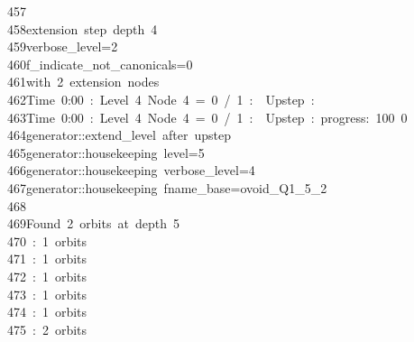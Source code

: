 \begin{tabbing}
457\>\\[0pt]
458\>extension\ step\ depth\ 4\\[0pt]
459\>verbose\_level=2\\[0pt]
460\>f\_indicate\_not\_canonicals=0\\[0pt]
461\>with\ 2\ extension\ nodes\\[0pt]
462\>Time\ 0:00\ :\ Level\ 4\ Node\ 4\ =\ 0\ /\ 1\ :\ \ Upstep\ :\ \\[0pt]
463\>Time\ 0:00\ :\ Level\ 4\ Node\ 4\ =\ 0\ /\ 1\ :\ \ Upstep\ :\ progress:\ 100\ 0\ \ \\[0pt]
464\>generator::extend\_level\ after\ upstep\\[0pt]
465\>generator::housekeeping\ level=5\\[0pt]
466\>generator::housekeeping\ verbose\_level=4\\[0pt]
467\>generator::housekeeping\ fname\_base=ovoid\_Q1\_5\_2\\[0pt]
468\>\\[0pt]
469\>Found\ 2\ orbits\ at\ depth\ 5\\[0pt]
470\ :\ 1\ orbits\\[0pt]
471\ :\ 1\ orbits\\[0pt]
472\ :\ 1\ orbits\\[0pt]
473\ :\ 1\ orbits\\[0pt]
474\ :\ 1\ orbits\\[0pt]
475\ :\ 2\ orbits\\[0pt]

\end{tabbing}
